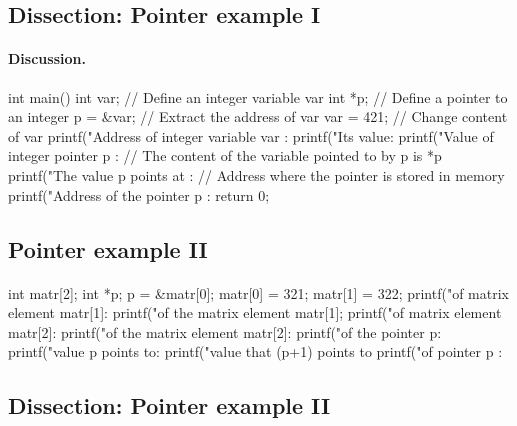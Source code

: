\documentclass[%
oneside,                 %
final,                   %
10pt]{article}
\begin{document}
{{{{{{%
\subsection{Dissection: Pointer example I}


\paragraph{Discussion.}

\bcppcod
int main()
{
  int var;     // Define an integer variable var
  int *p;      // Define a pointer to an integer
  p = &var;    // Extract the address of var
  var = 421;   // Change content of var
  printf("Address of integer variable var : %
  printf("Its value: %
  printf("Value of integer pointer p : %
  // The content of the variable pointed to by p is *p
  printf("The value p points at :  %
  // Address where the pointer is stored in memory
  printf("Address of the pointer p : %
  return 0;
}
\ecppcod



\subsection{Pointer example II}


\paragraph{}
\bcppcod
int matr[2];
int *p;
p = &matr[0];
matr[0] = 321;
matr[1] = 322;
printf("\nAddress of matrix element matr[1]: %
printf("\nValue of the  matrix element  matr[1]; %
printf("\nAddress of matrix element matr[2]: %
printf("\nValue of the matrix element  matr[2]: %
printf("\nValue of the pointer p: %
printf("\nThe value p points to: %
printf("\nThe value that (p+1) points to  %
printf("\nAddress of pointer p : %
\ecppcod



\subsection{Dissection: Pointer example II}


}}}}}}
\end{document}
